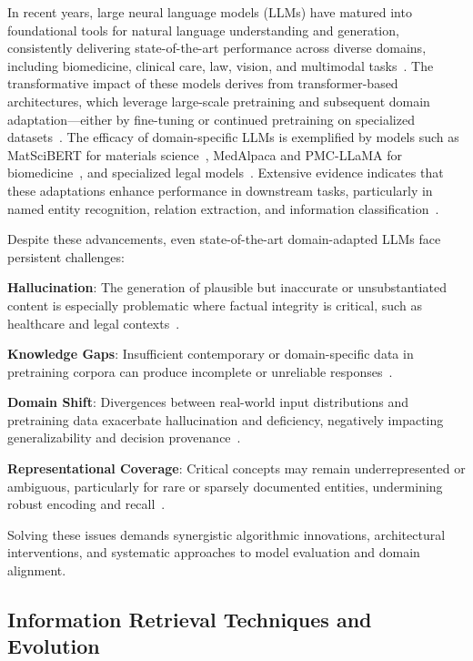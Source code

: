 \documentclass[sigconf]{acmart}
\begin{document}
In recent years, large neural language models (LLMs) have matured into foundational tools for natural language understanding and generation, consistently delivering state-of-the-art performance across diverse domains, including biomedicine, clinical care, law, vision, and multimodal tasks~\cite{ref1,ref2,ref3,ref6,ref7,ref8,ref29,ref31,ref42,ref48,ref52,ref63}. The transformative impact of these models derives from transformer-based architectures, which leverage large-scale pretraining and subsequent domain adaptation—either by fine-tuning or continued pretraining on specialized datasets~\cite{ref6,ref31,ref63}. The efficacy of domain-specific LLMs is exemplified by models such as MatSciBERT for materials science~\cite{ref29}, MedAlpaca and PMC-LLaMA for biomedicine~\cite{ref3,ref31,ref48}, and specialized legal models~\cite{ref8}. Extensive evidence indicates that these adaptations enhance performance in downstream tasks, particularly in named entity recognition, relation extraction, and information classification~\cite{ref3,ref29,ref31,ref42,ref48}.

Despite these advancements, even state-of-the-art domain-adapted LLMs face persistent challenges:

\textbf{Hallucination}: The generation of plausible but inaccurate or unsubstantiated content is especially problematic where factual integrity is critical, such as healthcare and legal contexts~\cite{ref7,ref20,ref46,ref52,ref54,ref63,ref64}.

\textbf{Knowledge Gaps}: Insufficient contemporary or domain-specific data in pretraining corpora can produce incomplete or unreliable responses~\cite{ref7,ref20,ref54,ref64}.

\textbf{Domain Shift}: Divergences between real-world input distributions and pretraining data exacerbate hallucination and deficiency, negatively impacting generalizability and decision provenance~\cite{ref7,ref63,ref64}.

\textbf{Representational Coverage}: Critical concepts may remain underrepresented or ambiguous, particularly for rare or sparsely documented entities, undermining robust encoding and recall~\cite{ref20,ref46,ref63}.

Solving these issues demands synergistic algorithmic innovations, architectural interventions, and systematic approaches to model evaluation and domain alignment.

\subsection{Information Retrieval Techniques and Evolution}
\end{document}
